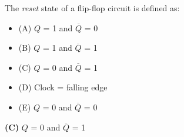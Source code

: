 

The {\it reset} state of a flip-flop circuit is defined as:

\begin{itemize}
\item{(A)} $Q$ = 1 and $\overline{Q}$ = 0
\vskip 5pt 
\item{(B)} $Q$ = 1 and $\overline{Q}$ = 1
\vskip 5pt 
\item{(C)} $Q$ = 0 and $\overline{Q}$ = 1
\vskip 5pt 
\item{(D)} Clock = falling edge
\vskip 5pt 
\item{(E)} $Q$ = 0 and $\overline{Q}$ = 0
\end{itemize}







{\bf (C)} $Q$ = 0 and $\overline{Q}$ = 1
 










